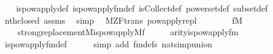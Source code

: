 \begin{isabellebody}
%
\isadelimproof
\ \ %
\endisadelimproof
%
\isatagproof
{}\isamarkupfalse%
\ is{\isacharunderscore}{\kern0pt}powapply{\isacharunderscore}{\kern0pt}def\ is{\isacharunderscore}{\kern0pt}powapply{\isacharunderscore}{\kern0pt}fm{\isacharunderscore}{\kern0pt}def\ is{\isacharunderscore}{\kern0pt}Collect{\isacharunderscore}{\kern0pt}def\ powerset{\isacharunderscore}{\kern0pt}def\ subset{\isacharunderscore}{\kern0pt}def\isanewline
\ \ \isamarkupfalse%
\ nth{\isacharunderscore}{\kern0pt}closed\ assms\ \isamarkupfalse%
\ simp%
\endisatagproof
{\isafoldproof}%
%
\isadelimproof
\isanewline
%
\endisadelimproof
\isanewline
\isanewline
{}\isamarkupfalse%
\ {\isacharparenleft}{\kern0pt}\ M{\isacharunderscore}{\kern0pt}ZF{\isacharunderscore}{\kern0pt}trans{\isacharparenright}{\kern0pt}\ powapply{\isacharunderscore}{\kern0pt}repl\ {\isacharcolon}{\kern0pt}\isanewline
\ \ \isanewline
\ \ \ \ {\isachardoublequoteopen}f{\isasymin}M{\isachardoublequoteclose}\isanewline
\ \ \isanewline
\ \ \ \ {\isachardoublequoteopen}strong{\isacharunderscore}{\kern0pt}replacement{\isacharparenleft}{\kern0pt}{\isacharhash}{\kern0pt}{\isacharhash}{\kern0pt}M{\isacharcomma}{\kern0pt}is{\isacharunderscore}{\kern0pt}powapply{\isacharparenleft}{\kern0pt}{\isacharhash}{\kern0pt}{\isacharhash}{\kern0pt}M{\isacharcomma}{\kern0pt}f{\isacharparenright}{\kern0pt}{\isacharparenright}{\kern0pt}{\isachardoublequoteclose}\isanewline
%
\isadelimproof
%
\endisadelimproof
%
\isatagproof
{}\isamarkupfalse%
\ {\isacharminus}{\kern0pt}\isanewline
\ \ \isamarkupfalse%
\ {\isachardoublequoteopen}arity{\isacharparenleft}{\kern0pt}is{\isacharunderscore}{\kern0pt}powapply{\isacharunderscore}{\kern0pt}fm{\isacharparenleft}{\kern0pt}{}{\isacharcomma}{\kern0pt}{}{\isacharcomma}{\kern0pt}{}{\isacharparenright}{\kern0pt}{\isacharparenright}{\kern0pt}\ {\isacharequal}{\kern0pt}\ {}{\isachardoublequoteclose}\isanewline
\ \ \ \ \isamarkupfalse%
\ is{\isacharunderscore}{\kern0pt}powapply{\isacharunderscore}{\kern0pt}fm{\isacharunderscore}{\kern0pt}def\isanewline
\ \ \ \ \isamarkupfalse%
\ {\isacharparenleft}{\kern0pt}simp\ add{\isacharcolon}{\kern0pt}\ fm{\isacharunderscore}{\kern0pt}defs\ nat{\isacharunderscore}{\kern0pt}simp{\isacharunderscore}{\kern0pt}union{\isacharparenright}{\kern0pt}\isanewline
\ \ \isamarkupfalse%
\isanewline
\ \ \isamarkupfalse%

\end{isabellebody}
